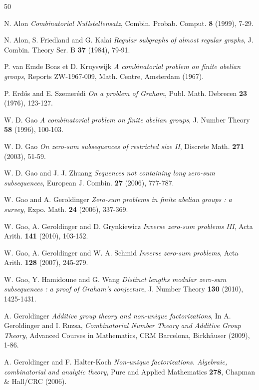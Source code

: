 \documentclass[english,12pt,a4paper,twoside]{smfart}
\theoremstyle{plain}
\theoremstyle{definition}
\theoremstyle{remark}
\begin{document}
\begin{thebibliography}{50}

{\sc N. Alon} {\it Combinatorial Nullstellensatz}, 
Combin. Probab. Comput. {\bf 8} (1999), 7-29.

{\sc N. Alon, S. Friedland and G. Kalai} {\it Regular subgraphs of almost regular graphs}, 
J. Combin. Theory Ser. B {\bf 37} (1984), 79-91.

{\sc P. van Emde Boas et D. Kruyswijk} {\it A combinatorial problem on finite abelian groups}, 
Reports ZW-1967-009, Math. Centre, Amsterdam (1967).

{\sc P. Erd\H{o}s and E. Szemer\'{e}di} {\it On a problem of Graham}, 
Publ. Math. Debrecen {\bf 23} (1976), 123-127.

{\sc W. D. Gao} {\it A combinatorial problem on finite abelian groups}, 
J. Number Theory {\bf 58} (1996), 100-103.
 
{\sc W. D. Gao} {\it On zero-sum subsequences of restricted size II}, 
Discrete Math. {\bf 271} (2003), 51-59.

{\sc W. D. Gao and J. J. Zhuang} {\it Sequences not containing long zero-sum subsequences}, 
European J. Combin. {\bf 27} (2006), 777-787.

{\sc W. Gao and A. Geroldinger} {\it Zero-sum problems in finite abelian groups : a survey}, 
Expo. Math. {\bf 24} (2006), 337-369.

{\sc W. Gao, A. Geroldinger and D. Grynkiewicz} {\it Inverse zero-sum problems III}, 
Acta Arith. {\bf 141} (2010), 103-152.

{\sc W. Gao, A. Geroldinger and W. A. Schmid} {\it Inverse zero-sum problems}, 
Acta Arith. {\bf 128} (2007), 245-279.

{\sc W. Gao, Y. Hamidoune and G. Wang} {\it Distinct lengths modular zero-sum subsequences : a proof of Graham's conjecture}, 
J. Number Theory {\bf 130} (2010), 1425-1431.

{\sc A. Geroldinger} {\it Additive group theory and non-unique factorizations}, In A. Geroldinger and I. Ruzsa, {\it Combinatorial Number Theory and Additive Group Theory}, Advanced Courses in Mathematics, CRM Barcelona, Birkh\"{a}user (2009), 1-86.

{\sc A. Geroldinger and F. Halter-Koch} {\it Non-unique factorizations. Algebraic, combinatorial and analytic theory}, 
Pure and Applied Mathematics {\bf 278}, Chapman \& Hall/CRC (2006).


\end{thebibliography}
\end{document}
